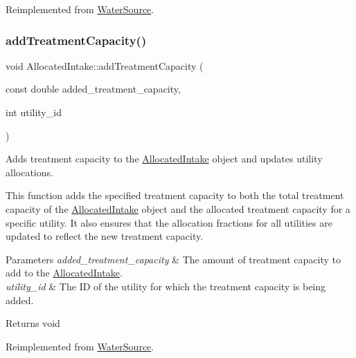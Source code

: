 Reimplemented from \mbox{\hyperlink{classWaterSource_ab869abb3d3dde1875e933482bedc3ae3}{Water\+Source}}.

\mbox{\label{classAllocatedIntake_ae16939ed474e15b9c68edcbf61696231}} 
\subsubsection{\texorpdfstring{add\+Treatment\+Capacity()}{addTreatmentCapacity()}}
{\footnotesize\ttfamily void Allocated\+Intake\+::add\+Treatment\+Capacity (\begin{DoxyParamCaption}\item[{const double}]{added\+\_\+treatment\+\_\+capacity,  }\item[{int}]{utility\+\_\+id }\end{DoxyParamCaption})\hspace{0.3cm}{\ttfamily [virtual]}}



Adds treatment capacity to the {\ttfamily \mbox{\hyperlink{classAllocatedIntake}{Allocated\+Intake}}} object and updates utility allocations. 

This function adds the specified treatment capacity to both the total treatment capacity of the {\ttfamily \mbox{\hyperlink{classAllocatedIntake}{Allocated\+Intake}}} object and the allocated treatment capacity for a specific utility. It also ensures that the allocation fractions for all utilities are updated to reflect the new treatment capacity.


\begin{DoxyParams}{Parameters}
{\em added\+\_\+treatment\+\_\+capacity} & The amount of treatment capacity to add to the {\ttfamily \mbox{\hyperlink{classAllocatedIntake}{Allocated\+Intake}}}. \\
\hline
{\em utility\+\_\+id} & The ID of the utility for which the treatment capacity is being added.\\
\hline
\end{DoxyParams}
\begin{DoxyReturn}{Returns}
void 
\end{DoxyReturn}


Reimplemented from \mbox{\hyperlink{classWaterSource_ac2bc1a09fce3a3201d62a73052b27b0b}{Water\+Source}}.

